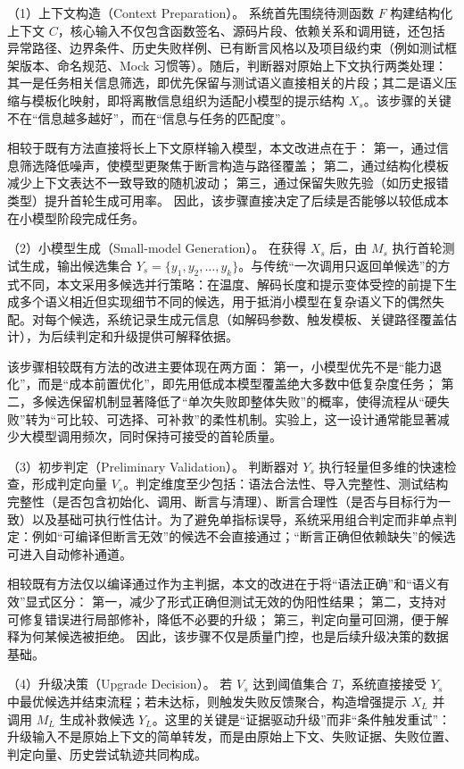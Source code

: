 （1）上下文构造（Context Preparation）。
系统首先围绕待测函数 $F$ 构建结构化上下文 $C$，核心输入不仅包含函数签名、源码片段、依赖关系和调用链，还包括异常路径、边界条件、历史失败样例、已有断言风格以及项目级约束（例如测试框架版本、命名规范、Mock 习惯等）。随后，判断器对原始上下文执行两类处理：其一是任务相关信息筛选，即优先保留与测试语义直接相关的片段；其二是语义压缩与模板化映射，即将离散信息组织为适配小模型的提示结构 $X_s$。该步骤的关键不在“信息越多越好”，而在“信息与任务的匹配度”。

相较于既有方法直接将长上下文原样输入模型，本文改进点在于：
第一，通过信息筛选降低噪声，使模型更聚焦于断言构造与路径覆盖；
第二，通过结构化模板减少上下文表达不一致导致的随机波动；
第三，通过保留失败先验（如历史报错类型）提升首轮生成可用率。
因此，该步骤直接决定了后续是否能够以较低成本在小模型阶段完成任务。

（2）小模型生成（Small-model Generation）。
在获得 $X_s$ 后，由 $M_s$ 执行首轮测试生成，输出候选集合 $Y_s=\{y_1,y_2,\ldots,y_k\}$。与传统“一次调用只返回单候选”的方式不同，本文采用多候选并行策略：在温度、解码长度和提示变体受控的前提下生成多个语义相近但实现细节不同的候选，用于抵消小模型在复杂语义下的偶然失配。对每个候选，系统记录生成元信息（如解码参数、触发模板、关键路径覆盖估计），为后续判定和升级提供可解释依据。

该步骤相较既有方法的改进主要体现在两方面：
第一，小模型优先不是“能力退化”，而是“成本前置优化”，即先用低成本模型覆盖绝大多数中低复杂度任务；
第二，多候选保留机制显著降低了“单次失败即整体失败”的概率，使得流程从“硬失败”转为“可比较、可选择、可补救”的柔性机制。实验上，这一设计通常能显著减少大模型调用频次，同时保持可接受的首轮质量。

（3）初步判定（Preliminary Validation）。
判断器对 $Y_s$ 执行轻量但多维的快速检查，形成判定向量 $V_s$。判定维度至少包括：语法合法性、导入完整性、测试结构完整性（是否包含初始化、调用、断言与清理）、断言合理性（是否与目标行为一致）以及基础可执行性估计。为了避免单指标误导，系统采用组合判定而非单点判定：例如“可编译但断言无效”的候选不会直接通过；“断言正确但依赖缺失”的候选可进入自动修补通道。

相较既有方法仅以编译通过作为主判据，本文的改进在于将“语法正确”和“语义有效”显式区分：
第一，减少了形式正确但测试无效的伪阳性结果；
第二，支持对可修复错误进行局部修补，降低不必要的升级；
第三，判定向量可回溯，便于解释为何某候选被拒绝。
因此，该步骤不仅是质量门控，也是后续升级决策的数据基础。

（4）升级决策（Upgrade Decision）。
若 $V_s$ 达到阈值集合 $T$，系统直接接受 $Y_s$ 中最优候选并结束流程；若未达标，则触发失败反馈聚合，构造增强提示 $X_L$ 并调用 $M_L$ 生成补救候选 $Y_L$。这里的关键是“证据驱动升级”而非“条件触发重试”：升级输入不是原始上下文的简单转发，而是由原始上下文、失败证据、失败位置、判定向量、历史尝试轨迹共同构成。

